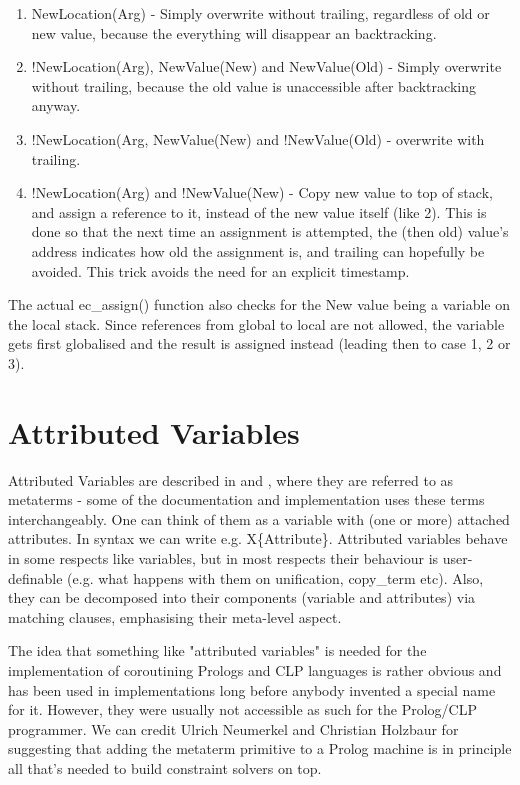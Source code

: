 \begin{enumerate}
\item NewLocation(Arg) - 
    Simply overwrite without trailing, regardless of old or new value,
    because the everything will disappear an backtracking.
\item !NewLocation(Arg), NewValue(New) and NewValue(Old)  -
    Simply overwrite without trailing,
    because the old value is unaccessible after backtracking anyway.
\item !NewLocation(Arg, NewValue(New) and !NewValue(Old) -
    overwrite with trailing.
\item !NewLocation(Arg) and !NewValue(New) -
Copy new value to top of stack, and assign a reference to it,
   instead of the new value itself (like 2).
    This is done so that the next time an assignment is attempted, the
    (then old) value's address indicates how old the assignment is,
    and trailing can hopefully be avoided.  This trick avoids the need
    for an explicit timestamp.
\end{enumerate}
The actual ec_assign() function also checks for the New value being
a variable on the local stack. Since references from global to local
are not allowed, the variable gets first globalised  and the result
is assigned instead (leading then to case 1, 2 or 3).



\section{Attributed Variables}

Attributed Variables are described in \cite{meier92} and
\cite{metaterms95}, where they are referred to as
metaterms - some of the {\eclipse} documentation and
implementation uses these terms interchangeably.  One can think of
them as a variable with (one or more) attached attributes.  In
{\eclipse} syntax we can write e.g. X\{Attribute\}.  Attributed
variables behave in some respects like variables, but in most respects
their behaviour is user-definable (e.g.  what happens with them on
unification, copy_term etc). 
Also, they can be decomposed into their components (variable and
attributes) via matching clauses, emphasising their meta-level aspect.

The idea that something like "attributed variables" is needed for the
implementation of coroutining  Prologs and CLP  languages is rather obvious
and has been used in implementations long before anybody invented a
special name for it. However, they were usually not accessible as such
for the Prolog/CLP programmer.
We can credit Ulrich Neumerkel and Christian Holzbaur for suggesting
that adding the metaterm primitive to a Prolog machine is in principle
all that's needed to build constraint solvers on top.

